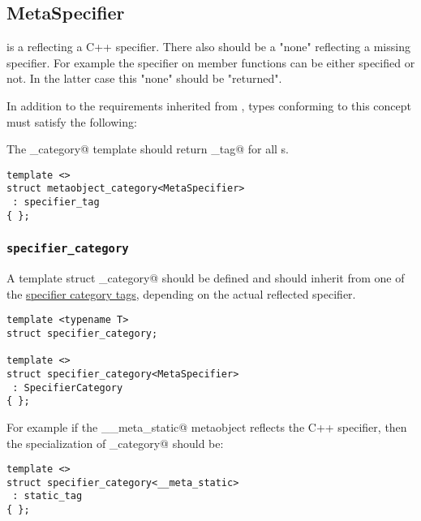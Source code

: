 \subsection{MetaSpecifier}
\label{concept-MetaSpecifier}


 is a  reflecting a C++ specifier. There also should be a "none"
 reflecting a missing specifier. For example the \verb@const@ specifier
on member functions can be either specified or not. In the latter case this "none" 
should be "returned".


In addition to the requirements inherited from , types conforming to this concept
must satisfy the following:

The \verb@metaobject_category@ template should return \verb@specifier_tag@ for all s.

\begin{verbatim}
template <>
struct metaobject_category<MetaSpecifier>
 : specifier_tag
{ };
\end{verbatim}

\subsubsection{\texttt{specifier\_category}}

A template struct \verb@specifier_category@ should be defined and should inherit from one of the
\hyperref[specifier-category-tags]{specifier category tags}, depending on
the actual reflected specifier.

\begin{verbatim}
template <typename T>
struct specifier_category;

template <>
struct specifier_category<MetaSpecifier>
 : SpecifierCategory
{ };
\end{verbatim}

For example if the \verb@__meta_static@ metaobject reflects the \verb@static@
C++ specifier, then the specialization of \verb@specifier_category@
should be:

\begin{verbatim}
template <>
struct specifier_category<__meta_static>
 : static_tag
{ };
\end{verbatim}

